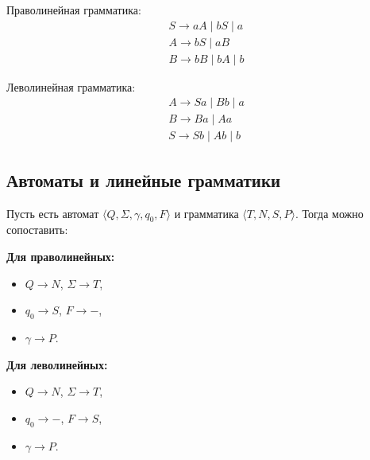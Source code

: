 \documentclass[11pt,a4paper]{article}
\newcommand{\rul}{\rightarrow}
\begin{document}
\begin{minipage}[t]{0.48\linewidth}
Праволинейная грамматика:
\[
\begin{array}{l}
S\rul aA\mid bS\mid a\\ A\rul bS\mid aB\\ B\rul bB\mid bA\mid b
\end{array}
\]
\end{minipage}\hfill
\begin{minipage}[t]{0.48\linewidth}
Леволинейная грамматика:
\[
\begin{array}{l}
A\rul Sa\mid Bb\mid a\\ B\rul Ba\mid Aa\\ S\rul Sb\mid Ab\mid b
\end{array}
\]
\end{minipage}

\subsection{Автоматы и линейные грамматики}

Пусть есть автомат $\langle Q,\Sigma,\gamma,q_0,F\rangle$ и грамматика $\langle T,N,S,P\rangle$. Тогда можно сопоставить:

\begin{minipage}[t]{0.48\linewidth}
\textbf{Для праволинейных:}
\begin{itemize}
\item $Q\rul N$, \quad $\Sigma\rul T$,
\item $q_0\rul S$, \quad $F\rul -$,
\item $\gamma\rul P$.
\end{itemize}
\end{minipage}\hfill
\begin{minipage}[t]{0.48\linewidth}
\textbf{Для леволинейных:}
\begin{itemize}
\item $Q\rul N$, \quad $\Sigma\rul T$,
\item $q_0\rul -$, \quad $F\rul S$,
\item $\gamma\rul P$.
\end{itemize}
\end{minipage}
\end{document}
